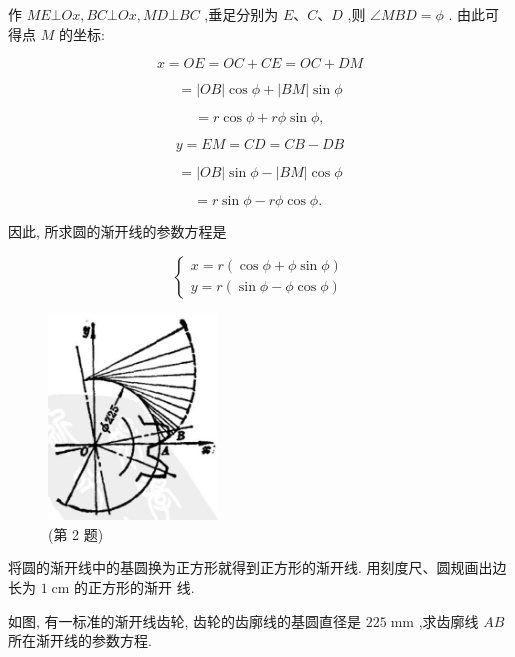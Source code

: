 \documentclass[lang=cn,newtx,10pt,scheme=chinese]{elegantbook}
\begin{document}
作 \({ME} \bot {Ox},{BC} \bot {Ox},{MD} \bot {BC}\) ,垂足分别为 \(E\text{、}C\text{、}D\) ,则 \(\angle {MBD} = \phi\) . 由此可得点 \(M\) 的坐标:

\[
  x = {OE} = {OC} + {CE} = {OC} + {DM}
\]

\[
  = \left| {OB}\right| \cos \phi + \left| {BM}\right| \sin \phi
\]

\[
  = r\cos \phi + {r\phi }\sin \phi ,
\]

\[
  y = {EM} = {CD} = {CB} - {DB}
\]

\[
  = \left| {OB}\right| \sin \phi - \left| {BM}\right| \cos \phi
\]

\[
  = r\sin \phi - {r\phi }\cos \phi \text{. }
\]

因此, 所求圆的渐开线的参数方程是

\[
  \left\{ \begin{array}{l} x = r\left( {\cos \phi + \phi \sin \phi }\right) \\ y = r\left( {\sin \phi - \phi \cos \phi }\right) \end{array}\right.
\]

\begin{problemset}[练习]

\item \begin{figure}[h]
  \centering
  \includegraphics[max width=0.4\textwidth]{images/01912cc2-ffb6-728e-9ae7-b113ff05c64b_168_702682.jpg}
  \caption{(第 2 题)}
\end{figure}



\item 将圆的渐开线中的基圆换为正方形就得到正方形的渐开线. 用刻度尺、圆规画出边长为 \(1\mathrm{\;{cm}}\) 的正方形的渐开 线.

\item 如图, 有一标准的渐开线齿轮, 齿轮的齿廓线的基圆直径是 \({225}\mathrm{\;{mm}}\) ,求齿廓线 \({AB}\) 所在渐开线的参数方程.

\end{problemset}
\end{document}
